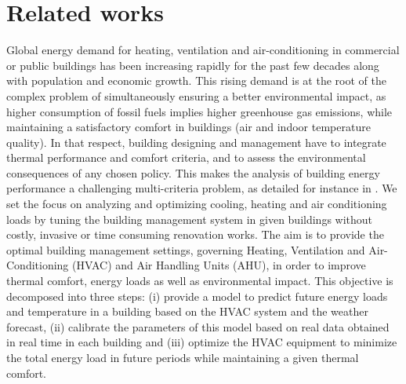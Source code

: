 \documentclass[12pt]{article}
\begin{document}
\section{Related works}
Global energy demand for heating, ventilation and air-conditioning  in commercial or public buildings has been increasing rapidly for the past few decades along with population and economic growth. This rising demand is at the root of the complex problem of simultaneously ensuring a better environmental impact, as higher consumption of fossil fuels implies higher greenhouse gas emissions, while maintaining a satisfactory comfort in buildings (air and indoor temperature quality). In that respect, building designing and management have to integrate thermal performance and comfort criteria, and to assess the environmental consequences of any chosen policy. This makes the analysis of building energy performance a challenging multi-criteria problem, as detailed for instance in \cite{Bre2016ResidentialBD}. We set the focus on analyzing and optimizing cooling, heating and air conditioning loads by tuning the building management system in given buildings without costly, invasive or time consuming renovation works. The aim is to provide the optimal building management settings, governing Heating, Ventilation and Air-Conditioning (HVAC) and Air Handling Units (AHU), in order to improve thermal comfort, energy loads as well as environmental impact. This objective is decomposed into three steps: (i) provide a model to predict future energy loads and temperature in a building based on the HVAC system and the weather forecast, (ii) calibrate the parameters of this model based on real data obtained in real time in each building and (iii) optimize the HVAC equipment to minimize the total energy load in future periods while maintaining a given thermal comfort.
\end{document}

